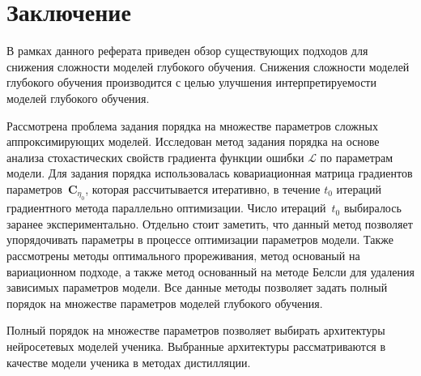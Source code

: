 \newpage

\section{Заключение}
В рамках данного реферата приведен обзор существующих подходов для снижения сложности моделей глубокого обучения. Снижения сложности моделей глубокого обучения производится с целью улучшения интерпретируемости моделей глубокого обучения.

Рассмотрена проблема задания порядка на множестве параметров сложных аппроксимирующих моделей. Исследован метод задания порядка на основе анализа стохастических свойств градиента функции ошибки $\mathcal{L}$ по параметрам модели. Для задания порядка использовалась ковариационная матрица градиентов параметров~$\textbf{C}_{\eta_0}$, которая рассчитывается итеративно, в течение $t_0$ итераций градиентного метода параллельно оптимизации. Число итераций~$t_0$ выбиралось заранее экспериментально. Отдельно стоит заметить, что данный метод позволяет упорядочивать параметры в процессе оптимизации параметров модели. Также рассмотрены методы оптимального прореживания, метод основаный на вариационном подходе, а также метод основанный на методе Белсли для удаления зависимых параметров модели. Все данные методы позволяет задать полный порядок на множестве параметров моделей глубокого обучения. 

Полный порядок на множестве параметров позволяет выбирать архитектуры нейросетевых моделей ученика. Выбранные архитектуры рассматриваются в качестве модели ученика в методах дистилляции.